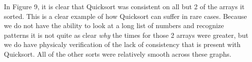 
In Figure 9, it is clear that Quicksort was consistent on all but 2 of the arrays it sorted. This is a clear example of how Quicksort can suffer in rare cases.
Because we do not have the ability to look at a long list of numbers and recognize patterns it is not quite as clear \emph{why} the times for those 2 arrays were
greater, but we do have physicaly verification of the lack of consistency that is present with Quicksort. All of the other sorts were relatively smooth across
these graphs.

